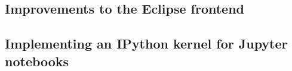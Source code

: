

\subsection{Improvements to the Eclipse frontend}
\label{ssec:impr-eclipse}



\subsection{Implementing an IPython kernel for Jupyter notebooks}
\label{ssec:discuss-literate-programming}



